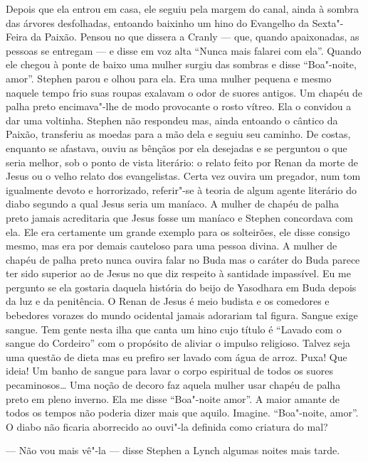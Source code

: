 Depois que ela entrou em casa, ele seguiu pela margem do canal, ainda à sombra
das árvores desfolhadas, entoando baixinho um hino do Evangelho da Sexta"-Feira
da Paixão.  Pensou no que dissera a Cranly --- que, quando apaixonadas, as
pessoas se entregam --- e disse em voz alta “Nunca mais falarei com ela”.
Quando ele chegou à ponte de baixo uma mulher surgiu das sombras e disse “Boa"-noite,
amor”.  Stephen parou e olhou para ela.  \label{era"-uma} Era uma mulher pequena e mesmo
naquele tempo frio suas roupas exalavam o odor de suores antigos.  Um chapéu de
palha preto encimava"-lhe de modo provocante o rosto vítreo.  Ela o convidou a
dar uma voltinha.  Stephen não respondeu mas, ainda entoando o cântico da
Paixão, transferiu as moedas para a mão dela e seguiu seu caminho.  De costas,
enquanto se afastava, ouviu as bênçãos por ela desejadas e se perguntou o que
seria melhor, sob o ponto de vista literário: o relato feito por Renan da morte
de Jesus ou o velho relato dos evangelistas.  Certa vez ouvira um pregador, num
tom igualmente devoto e horrorizado, referir"-se à teoria de algum agente
literário do diabo segundo a qual Jesus seria um maníaco.  A mulher de chapéu
de palha preto jamais acreditaria que Jesus fosse um maníaco e Stephen
concordava com ela.  Ele era certamente um grande exemplo para os solteirões,
ele disse consigo mesmo, mas era por demais cauteloso para uma pessoa divina.
A mulher de chapéu de palha preto nunca ouvira falar no Buda mas o caráter do
Buda parece ter sido superior ao de Jesus no que diz respeito à santidade
impassível.  Eu me pergunto se ela gostaria daquela história do beijo de
Yasodhara em Buda depois da luz e da penitência.  O Renan de Jesus é meio
budista e os comedores e bebedores vorazes do mundo ocidental jamais adorariam
tal figura.  Sangue exige sangue.  Tem gente nesta ilha que canta um hino cujo
título é “Lavado com o sangue do Cordeiro” com o propósito de aliviar o impulso
religioso.  Talvez seja uma questão de dieta mas eu prefiro ser
lavado com água de arroz.  Puxa!  Que ideia!  Um banho de sangue para lavar o
corpo espiritual de todos os suores pecaminosos\ldots{}  Uma noção de decoro faz
aquela mulher usar chapéu de palha preto em pleno inverno.  Ela me disse “\mbox{Boa"-noite}
amor”.  A maior amante de todos os tempos não poderia dizer mais que
aquilo.  Imagine.  “Boa"-noite, amor”.  O diabo não ficaria aborrecido ao
ouvi"-la definida como criatura do mal?

--- Não vou mais vê"-la --- disse Stephen a Lynch algumas noites mais tarde.

